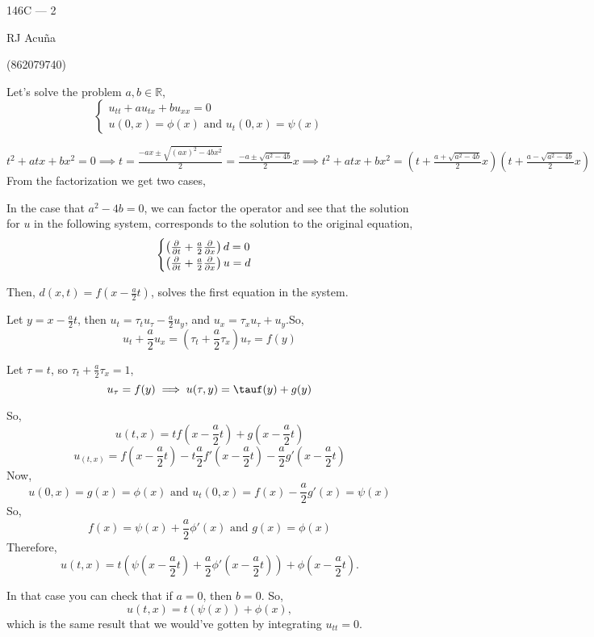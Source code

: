 \documentclass{article}
\newcommand\R{\mathbb{R}}
\begin{document}
\begin{center}
  146C --- 2

  RJ Acuña

  (862079740)
\end{center}\vspace{1.618em}

Let's solve the
problem $a,b \in \R$,
\[\begin{cases}u_{tt} +au_{tx}+bu_{xx} = 0\\ u(0,x)= \phi(x)\text{ and
    }u_t(0,x) = \psi(x)\end{cases}\]

$t^2+atx+bx^2 = 0 \implies t = \frac{-ax\pm\sqrt{(ax)^2 - 4bx^2}}{2} =
\frac{-a \pm \sqrt{a^2-4b}}{2}x \implies t^2+atx+bx^2 = \left(t +
  \frac{a + \sqrt{a^2-4b}}{2}x \right)\left(t + \frac{a -
    \sqrt{a^2-4b}}{2}x  \right)$
From the factorization we get two cases,

In the case that
$a^2-4b = 0$, we can factor the operator and see that the solution for
$u$ in the following system, corresponds to the solution to the
original equation,
\[\begin{cases} \left(\pdv{t} +
      \frac{a}{2}\pdv{x} \right)d = 0\\ \left(\pdv{t} +
      \frac{a}{2}\pdv{x}  \right)u = d\end{cases}\]

Then, $d(x,t) = f(x-\frac{a}{2}t)$, solves the first equation in the system.

Let $y = x-\frac{a}{2}t$, then $u_t = \tau_tu_{\tau}-\frac{a}{2}u_y$, and
$u_x = \tau_xu_{\tau} +u_y$.So,
\[u_t+\frac{a}{2}u_x =(\tau_t+\frac{a}{2}\tau_x)u_{\tau} = f(y) \]

Let $\tau = t$, so $\tau_t+\frac{a}{2}\tau_x = 1$,
\[u_{\tau} = f(y) \implies u(\tau,y) = \tauf(y) +g(y) \]

So,
\[u(t,x) = tf(x-\frac{a}{2}t) +g(x-\frac{a}{2}t)\]
\[u_(t,x) = f(x-\frac{a}{2}t) -t\frac{a}{2}f'(x-\frac{a}{2}t) -\frac{a}{2}g'(x-\frac{a}{2}t)\]
Now,
\[u(0,x) = g(x) = \phi(x)\text{ and } u_t(0,x) = f(x)
  -\frac{a}{2}g'(x) = \psi(x)\]
So,
\[f(x) = \psi(x)+\frac{a}{2}\phi'(x)\text{ and }g(x) = \phi(x)\]
Therefore,
\[u(t,x) = t\left( \psi(x-\frac{a}{2}t)
    +\frac{a}{2}\phi'(x-\frac{a}{2}t)\right)+\phi(x-\frac{a}{2}t).\]

In that case you can check that if $a = 0 $, then $b = 0$. So,
\[u(t,x) = t\left( \psi(x) \right)+\phi(x),\]
which is the same result that we would've gotten by integrating
$u_{tt} = 0.$
\end{document}
